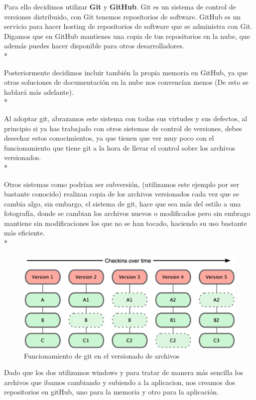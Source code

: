 \documentclass[../pfc.tex]{subfiles}
\begin{document}
	Para ello decidimos utilizar \textbf{Git} y \textbf{GitHub}.
	Git es un sistema de control de versiones distribuido, con Git tenemos repositorios de software. GitHub es un servicio para hacer hosting de repositorios de software que se administra con Git. Digamos que en GitHub mantienes una copia de tus repositorios en la nube, que además puedes hacer disponible para otros desarrolladores\cite{gitexplicacion}.\\* 
	
	Posteriormente decidimos incluir también la propia memoria en GitHub, ya que otras soluciones de documentación en la nube nos convencían menos (De esto se hablará más adelante).\\*
			
	Al adoptar git, abrazamos este sistema con todas sus virtudes y sus defectos, al principio si ya has trabajado con otros sistemas de control de versiones, debes desechar estos conocimientos, ya que tienen que ver muy poco con el funcionamiento que tiene git a la hora de llevar el control sobre los archivos versionados.\\*
	
	Otros sistemas como podrían ser subversión, (utilizamos este ejemplo por ser bastante conocido) realizan copia de los archivos versionados cada vez que se cambia algo, sin embargo, el sistema de git, hace que sea más del estilo a una fotografía, donde se cambian los archivos nuevos o modificados pero sin embrago mantiene sin modificaciones los que no se han tocado, haciendo su uso bastante más eficiente\cite{funcgit2}.\\*
	
	\begin{figure}[H]
	\centering
	\includegraphics[width=0.7\linewidth]{../images/funcionamiento_git}
	\caption{Funcionamiento de git en el versionado de archivos}
	\label{fig:funcionamiento_git}
	\end{figure}

	Dado que los dos utilizamos windows y para tratar de manera más sencilla los archivos que ibamos cambiando y subiendo a la aplicacion, nos creamos dos repositorios en gitHub, uno para la memoria y otro para la aplicación.
	
\end{document}

